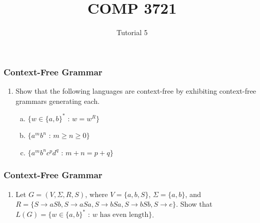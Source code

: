 \documentclass[11.5pt]{beamer}
\title{COMP 3721}
\author{Tutorial 5}
\begin{document}
\begin{frame}
  \titlepage
\end{frame}

\begin{frame}[t]
\frametitle{Context-Free Grammar}
\begin{enumerate}[(1)]
\item Show that the following languages are context-free by exhibiting context-free grammars generating each.
    \begin{enumerate}[(a)]
        \item<1-> $\{\text{$w\in \{a,b\}^*$ : $w = w^R$}\}$
        \item<3-> $\{\text{$a^mb^n$ : $m\geq n\geq 0$}\}$
        \item<5-> $\{\text{$a^mb^nc^pd^q$ : $m+n = p+q$}\}$
    \end{enumerate}
\end{enumerate}
\end{frame}

\begin{frame}[t]
\frametitle{Context-Free Grammar}
\begin{enumerate}[(2)]
\item Let $G = (V,\Sigma,R, S)$, where $V = \{a, b, S\}$, $\Sigma = \{a, b\}$, and $R = \{S \to aSb, S \to aSa, S \to bSa, S \to bSb, S \to e\}$. Show that $L(G) = \{\text{$w \in \{a, b\}^*$ : $w$ has even length}\}$.
\end{enumerate}
\end{frame}
\end{document}
